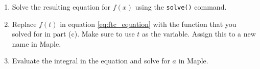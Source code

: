 \begin{enumerate}
\begin{enumerate}
        \begin{fullwidth}
        \end{fullwidth}
        \item Solve the resulting equation for $f(x)$ using the \texttt{solve()} command. 
        \item Replace $f(t)$ in equation \eqref{eq:ftc_equation} with the function that you solved for in part (c). Make sure to use $t$ as the variable. Assign this to a new name in Maple.
        \item Evaluate the integral in the equation and solve for $a$ in Maple.
    \end{enumerate}
\end{enumerate}